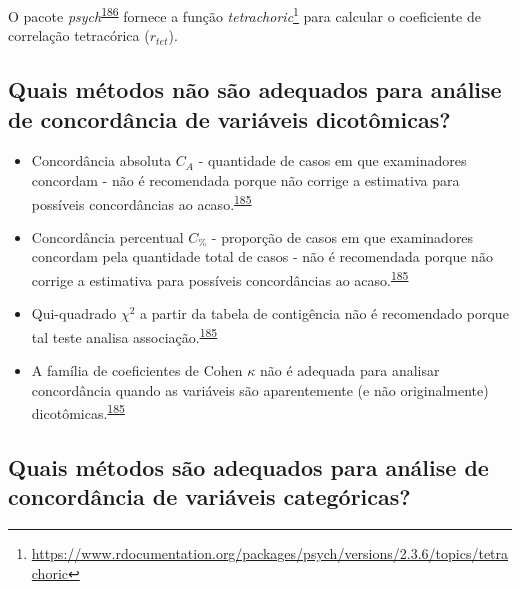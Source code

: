 \documentclass[
  a4paper,
]{book}
\renewcommand{\href}[2]{#2\footnote{\url{#1}}}
\newenvironment{infobox}[1]
  {
  \begin{itemize}
  \renewcommand{\labelitemi}{
    \raisebox{-.7\height}[0pt][0pt]{
      {\setkeys{Gin}{width=3em,keepaspectratio}
        \texttt{[image: \#1]}}
    }
  }
  \setlength{\fboxsep}{1em}
  \begin{blackbox}
  \item
  }
  {
  \end{blackbox}
  \end{itemize}
  }
\begin{document}
\begin{infobox}{images/Rlogo}
O pacote \emph{psych}\textsuperscript{\protect\hyperlink{ref-psych}{186}} fornece a função \href{https://www.rdocumentation.org/packages/psych/versions/2.3.6/topics/tetrachoric}{\emph{tetrachoric}} para calcular o coeficiente de correlação tetracórica (\(r_{tet}\)).

\end{infobox}

\hypertarget{quais-muxe9todos-nuxe3o-suxe3o-adequados-para-anuxe1lise-de-concorduxe2ncia-de-variuxe1veis-dicotuxf4micas}{%
\subsection{Quais métodos não são adequados para análise de concordância de variáveis dicotômicas?}\label{quais-muxe9todos-nuxe3o-suxe3o-adequados-para-anuxe1lise-de-concorduxe2ncia-de-variuxe1veis-dicotuxf4micas}}

\begin{itemize}
\item
  Concordância absoluta \(C_{A}\) - quantidade de casos em que examinadores concordam - não é recomendada porque não corrige a estimativa para possíveis concordâncias ao acaso.\textsuperscript{\protect\hyperlink{ref-banerjee1999}{185}}
\item
  Concordância percentual \(C_{\%}\) - proporção de casos em que examinadores concordam pela quantidade total de casos - não é recomendada porque não corrige a estimativa para possíveis concordâncias ao acaso.\textsuperscript{\protect\hyperlink{ref-banerjee1999}{185}}
\item
  Qui-quadrado \(\chi^2\) a partir da tabela de contigência não é recomendado porque tal teste analisa associação.\textsuperscript{\protect\hyperlink{ref-banerjee1999}{185}}
\item
  A família de coeficientes de Cohen \(\kappa\) não é adequada para analisar concordância quando as variáveis são aparentemente (e não originalmente) dicotômicas.\textsuperscript{\protect\hyperlink{ref-banerjee1999}{185}}
\end{itemize}

\hypertarget{quais-muxe9todos-suxe3o-adequados-para-anuxe1lise-de-concorduxe2ncia-de-variuxe1veis-categuxf3ricas}{%
\subsection{Quais métodos são adequados para análise de concordância de variáveis categóricas?}\label{quais-muxe9todos-suxe3o-adequados-para-anuxe1lise-de-concorduxe2ncia-de-variuxe1veis-categuxf3ricas}}
\end{document}
